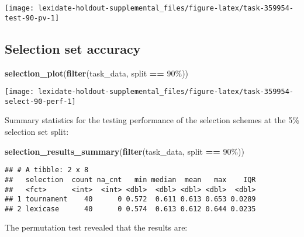 \documentclass[
]{book}
\newenvironment{Shaded}{\begin{snugshade}}{\end{snugshade}}
\newcommand{\FunctionTok}[1]{\textcolor[rgb]{0.13,0.29,0.53}{\textbf{#1}}}
\newcommand{\NormalTok}[1]{#1}
\newcommand{\SpecialCharTok}[1]{\textcolor[rgb]{0.81,0.36,0.00}{\textbf{#1}}}
\newcommand{\StringTok}[1]{\textcolor[rgb]{0.31,0.60,0.02}{#1}}
\begin{document}
\texttt{[image: lexidate-holdout-supplemental\_files/figure-latex/task-359954-test-90-pv-1]}

\hypertarget{selection-set-accuracy-8}{%
\subsection{Selection set accuracy}\label{selection-set-accuracy-8}}

\begin{Shaded}
\begin{Highlighting}[]
\FunctionTok{selection\_plot}\NormalTok{(}\FunctionTok{filter}\NormalTok{(task\_data, split }\SpecialCharTok{==} \StringTok{\textquotesingle{}90\%\textquotesingle{}}\NormalTok{))}
\end{Highlighting}
\end{Shaded}

\texttt{[image: lexidate-holdout-supplemental\_files/figure-latex/task-359954-select-90-perf-1]}

Summary statistics for the testing performance of the selection schemes at the 5\% selection set split:

\begin{Shaded}
\begin{Highlighting}[]
\FunctionTok{selection\_results\_summary}\NormalTok{(}\FunctionTok{filter}\NormalTok{(task\_data, split }\SpecialCharTok{==} \StringTok{\textquotesingle{}90\%\textquotesingle{}}\NormalTok{))}
\end{Highlighting}
\end{Shaded}

\begin{verbatim}
## # A tibble: 2 x 8
##   selection  count na_cnt   min median  mean   max    IQR
##   <fct>      <int>  <int> <dbl>  <dbl> <dbl> <dbl>  <dbl>
## 1 tournament    40      0 0.572  0.611 0.613 0.653 0.0289
## 2 lexicase      40      0 0.574  0.613 0.612 0.644 0.0235
\end{verbatim}

The permutation test revealed that the results are:
\end{document}
